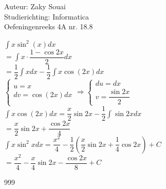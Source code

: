 \documentclass[a4paper]{article}
\begin{document}
  
\noindent \large Auteur: Zaky Souai \\
\noindent \large Studierichting:  Informatica\\
\noindent \large Oefeningenreeks 4A nr. 18.8\\

\bigskip

\normalsize

$\displaystyle\int x\sin^2 (x) dx$\\


$= \displaystyle \int x\cdot \dfrac{1-\cos 2x}{2} dx$\\

$= \displaystyle \dfrac{1}{2} \int x dx - \dfrac{1}{2}\int x\cos (2x)dx$\\

$\left\{\begin{array}{l}
u=x\\
dv=\cos (2x)dx
\end{array}
\Rightarrow
\left\{\begin{array}{l}
du=dx\\
v=\dfrac{\sin 2x}{2}
\end{array}\right.\right.$\\

$\displaystyle
\int x \cos (2x)dx
=
\dfrac{x}{2}\sin 2x-\dfrac{1}{2}\int \sin 2x dx$\\

$\displaystyle
=
\dfrac{x}{2}\sin 2x + \dfrac{\cos 2x}{4}$\\

$\displaystyle
\int x\sin^2 xdx
=
\dfrac{x^2}{4}
-\dfrac{1}{2}\left(\dfrac{x}{2}\sin 2x + \dfrac14\cos 2x\right)+C$\\

$\displaystyle
=
\dfrac{x^2}{4}-\dfrac{x}{4}\sin 2x - \dfrac{\cos 2x}{8} + C$


\begin{thebibliography}{999}
\end{thebibliography}
\end{document}
